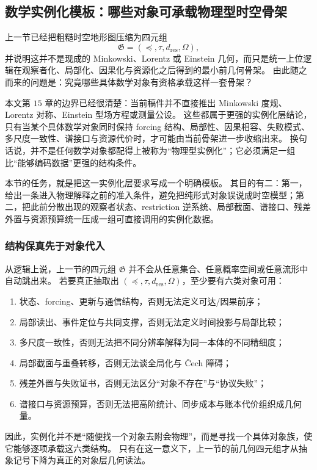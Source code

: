 \subsection{数学实例化模板：哪些对象可承载物理型时空骨架}\label{subsec:typed-address-biaxial-completion-instantiation-template}
上一节已经把粗糙时空地形图压缩为四元组
\[
\mathfrak G=(\preceq,\tau,d_{\mathrm{res}},\Omega),
\]
并说明这并不是现成的 Minkowski、Lorentz 或 Einstein 几何，而只是统一上位逻辑在观察者化、局部化、因果化与资源化之后得到的最小前几何骨架。
由此随之而来的问题是：究竟哪些具体数学对象有资格承载这样一套骨架？

本文第 \(15\) 章的边界已经很清楚：当前稿件并不直接推出 Minkowski 度规、Lorentz 对称、Einstein 型场方程或测量公设。
这些都属于更强的实例化层结论，只有当某个具体数学对象同时保持 forcing 结构、局部性、因果相容、失败模式、多尺度一致性、谱接口与资源代价时，才可能由当前骨架进一步收缩出来。
换句话说，并不是任何数学对象都配得上被称为“物理型实例化”；它必须满足一组比“能够编码数据”更强的结构条件。

本节的任务，就是把这一实例化层要求写成一个明确模板。
其目的有二：第一，给出一条进入物理解释之前的准入条件，避免把纯形式对象误说成时空模型；第二，把此前分散出现的观察者状态、restriction 逆系统、局部截面、谱接口、残差外置与资源预算统一压成一组可直接调用的实例化数据。

\subsubsection{结构保真先于对象代入}\label{subsubsec:typed-address-biaxial-completion-instantiation-structure-faithfulness}
从逻辑上说，上一节的四元组 \(\mathfrak G\) 并不会从任意集合、任意概率空间或任意流形中自动跳出来。
若要真正抽取出 \((\preceq,\tau,d_{\mathrm{res}},\Omega)\)，至少要有六类对象可用：
\begin{enumerate}
  \item 状态、forcing、更新与通信结构，否则无法定义可达/因果前序；
  \item 局部读出、事件定位与共同支撑，否则无法定义时间投影与局部比较；
  \item 多尺度一致性，否则无法把不同分辨率解释为同一本体的不同精细度；
  \item 局部截面与重叠转移，否则无法谈全局化与 Čech 障碍；
  \item 残差外置与失败证书，否则无法区分“对象不存在”与“协议失败”；
  \item 谱接口与资源预算，否则无法把高阶统计、同步成本与账本代价组织成几何量。
\end{enumerate}
因此，实例化并不是“随便找一个对象去附会物理”，而是寻找一个具体对象族，使它能够逐项承载这六类结构。
只有在这一意义下，上一节的前几何四元组才从抽象记号下降为真正的对象层几何读法。

